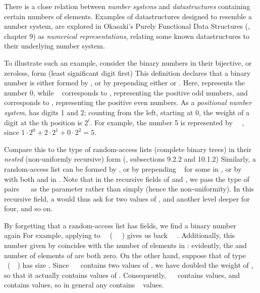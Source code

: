 There is a close relation between \emph{number systems} and \emph{datastructures} containing certain numbers of elements. Examples of datastructures designed to resemble a number system, are explored in Okasaki's Purely Functional Data Structures (\cite{purelyfunctional}, chapter 9) as \emph{numerical representations}, relating some known datastructures to their underlying number system.

To illustrate such an example, consider the binary numbers in their bijective, or zeroless, form (least significant digit first)
This definition declares that a binary number is either formed by , or by prepending either  or . Here,  represents the number 0, while \  corresponds to , representing the positive odd numbers, and  corresponds to , representing the positive even numbers. As a \emph{positional number system},  has digits 1 and 2; counting from the left, starting at 0, the weight of a digit at the th position is $2^i$. For example, the number 5 is represented by \ \ , since $1 \cdot 2^0 + 2 \cdot 2^1 + 0 \cdot 2^2 = 5$.

Compare this to the type of random-access lists (complete binary trees) in their \emph{nested} (non-uniformly recursive) form (\cite{purelyfunctional}, subsections 9.2.2 and 10.1.2)
Similarly, a random-access list can be formed by , or by prepending \  for some  in , or by \ \  with both  and  in . Note that in the recursive fields of  and , we pass the type of pairs \ \  as the parameter rather than simply  (hence the non-uniformity). In this recursive field, a  would thus ask for two values of , and another level deeper for four, and so on.

By forgetting that a random-access list  has fields, we find a binary number \  again
For example, applying  to \ \AV{\_}\ (\ \AV{\_}\ \AV{\_} ) gives us back \ \ . Additionally, this number given by  coincides with the number of elements in : evidently, the  and number of elements of  are both zero. On the other hand, suppose that  of type \ (\ \ ) has size . Since \ \  contains two values of , we have doubled the weight of , so that it actually contains  values of . Consequently, \ \  contains  values, and \ \ \  contains  values, so in general any  contains \  values.


